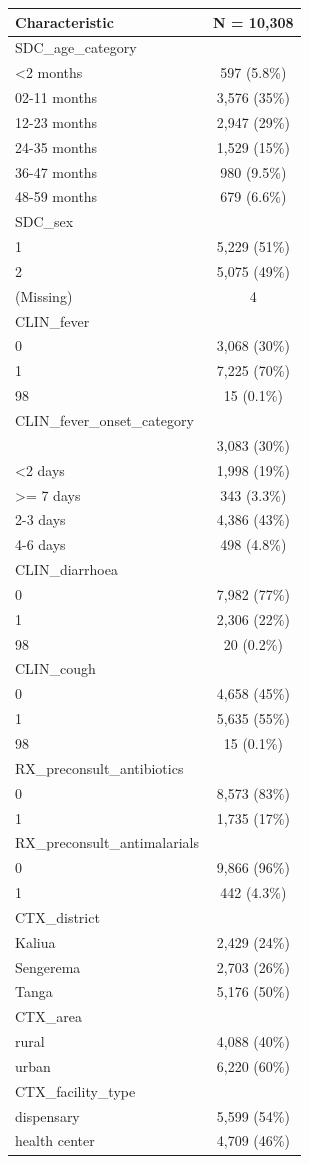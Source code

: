\documentclass[
  letterpaper,
  DIV=11,
  numbers=noendperiod,
  oneside]{scrreprt}
\begin{document}
\begin{longtable}[]{@{}lc@{}}
\toprule()
\textbf{Characteristic} & \textbf{N = 10,308} \\
\midrule()
\endhead
SDC\_age\_category & \\
\textless2 months & 597 (5.8\%) \\
02-11 months & 3,576 (35\%) \\
12-23 months & 2,947 (29\%) \\
24-35 months & 1,529 (15\%) \\
36-47 months & 980 (9.5\%) \\
48-59 months & 679 (6.6\%) \\
SDC\_sex & \\
1 & 5,229 (51\%) \\
2 & 5,075 (49\%) \\
(Missing) & 4 \\
CLIN\_fever & \\
0 & 3,068 (30\%) \\
1 & 7,225 (70\%) \\
98 & 15 (0.1\%) \\
CLIN\_fever\_onset\_category & \\
& 3,083 (30\%) \\
\textless2 days & 1,998 (19\%) \\
\textgreater= 7 days & 343 (3.3\%) \\
2-3 days & 4,386 (43\%) \\
4-6 days & 498 (4.8\%) \\
CLIN\_diarrhoea & \\
0 & 7,982 (77\%) \\
1 & 2,306 (22\%) \\
98 & 20 (0.2\%) \\
CLIN\_cough & \\
0 & 4,658 (45\%) \\
1 & 5,635 (55\%) \\
98 & 15 (0.1\%) \\
RX\_preconsult\_antibiotics & \\
0 & 8,573 (83\%) \\
1 & 1,735 (17\%) \\
RX\_preconsult\_antimalarials & \\
0 & 9,866 (96\%) \\
1 & 442 (4.3\%) \\
CTX\_district & \\
Kaliua & 2,429 (24\%) \\
Sengerema & 2,703 (26\%) \\
Tanga & 5,176 (50\%) \\
CTX\_area & \\
rural & 4,088 (40\%) \\
urban & 6,220 (60\%) \\
CTX\_facility\_type & \\
dispensary & 5,599 (54\%) \\
health center & 4,709 (46\%) \\
\bottomrule()
\end{longtable}
\end{document}

